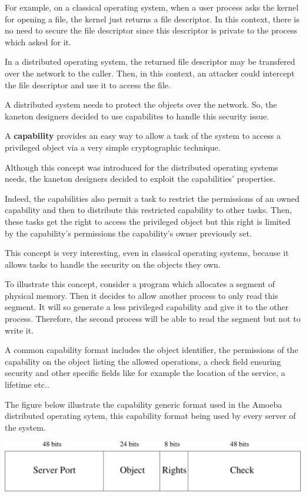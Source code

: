 \begin{multicols}{2}
For example, on a classical operating system, when a user process asks
the kernel for opening a file, the kernel just returns a file descriptor.
In this context, there is no need to secure the file descriptor since
this descriptor is private to the process which asked for it.

In a distributed operating system, the returned file descriptor may
be transfered over the network to the caller. Then, in this context,
an attacker could intercept the file descriptor and use it to access
the file.

A distributed system needs to protect the objects over the network. So,
the kaneton designers decided to use capabilites to handle this security
issue.

A \textbf{capability} provides an easy way to allow a task of the
system to access a privileged object via a very simple cryptographic
technique.

Although this concept was introduced for the distributed operating systems
needs, the kaneton designers decided to exploit the capabilities' properties.

Indeed, the capabilities also permit a task to restrict the permissions
of an owned capability and then to distribute this restricted capability
to other tasks. Then, these tasks get the right to access the privileged
object but this right is limited by the capability's permissions the
capability's owner previously set.

This concept is very interesting, even in classical operating systems,
because it allows tasks to handle the security on the objects they own.

To illustrate this concept, consider a program which allocates a segment of
physical memory. Then it decides to allow another process to only read
this segment. It will so generate a less privileged capability and give
it to the other process. Therefore, the second process will be able to read
the segment but not to write it.

A common capability format includes the object identifier, the permissions
of the capability on the object listing the allowed operations, a check field
ensuring security and other specific fields like for example the location
of the service, a lifetime etc..

The figure below illustrate the capability generic format used in the Amoeba
distributed operating sytem, this capability format being used by every
server of the system.

\begin{center}
  \includegraphics[scale=0.35]{figures/capability.pdf}
\end{center}


\end{multicols}
